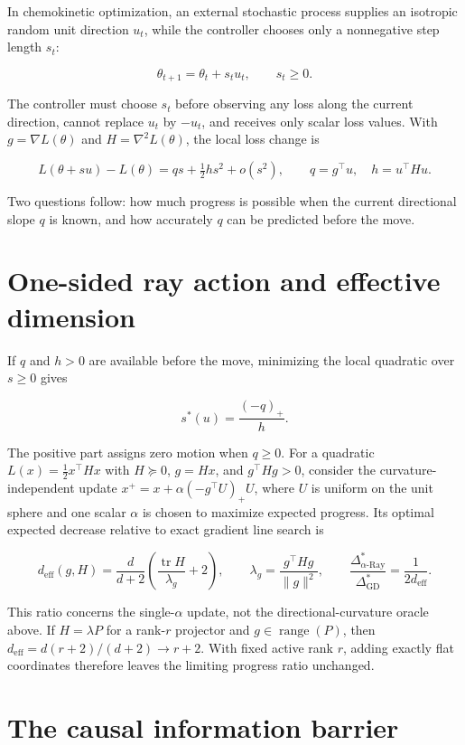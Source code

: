 \documentclass[11pt]{article}
\begin{document}
In chemokinetic optimization, an external stochastic process supplies an isotropic random unit direction \(u_t\), while the controller chooses only a nonnegative step length \(s_t\):

\[
\theta_{t+1}=\theta_t+s_tu_t,\qquad s_t\geq0.
\]

The controller must choose \(s_t\) before observing any loss along the current direction, cannot replace \(u_t\) by \(-u_t\), and receives only scalar loss values. With \(g=\nabla L(\theta)\) and \(H=\nabla^2L(\theta)\), the local loss change is

\[
L(\theta+su)-L(\theta)=qs+\tfrac12hs^2+o(s^2),
\qquad q=g^\top u,\quad h=u^\top Hu.
\]

Two questions follow: how much progress is possible when the current directional slope \(q\) is known, and how accurately \(q\) can be predicted before the move.

\section{One-sided ray action and effective dimension}\label{oracle-ray-ck}

If \(q\) and \(h>0\) are available before the move, minimizing the local quadratic over \(s\geq0\) gives

\[
s^*(u)=\frac{(-q)_+}{h}.
\]

The positive part assigns zero motion when \(q\geq0\). For a quadratic \(L(x)=\tfrac12x^\top Hx\) with \(H\succeq0\), \(g=Hx\), and \(g^\top Hg>0\), consider the curvature-independent update \(x^+=x+\alpha(-g^\top U)_+U\), where \(U\) is uniform on the unit sphere and one scalar \(\alpha\) is chosen to maximize expected progress. Its optimal expected decrease relative to exact gradient line search is

\[
d_{\mathrm{eff}}(g,H)
=\frac{d}{d+2}\left(\frac{\operatorname{tr}H}{\lambda_g}+2\right),
\qquad
\lambda_g=\frac{g^\top Hg}{\lVert g\rVert^2},
\qquad
\frac{\Delta^*_{\alpha\text{-Ray}}}{\Delta^*_{\mathrm{GD}}}
=\frac{1}{2d_{\mathrm{eff}}}.
\]

This ratio concerns the single-\(\alpha\) update, not the directional-curvature oracle above. If \(H=\lambda P\) for a rank-\(r\) projector and \(g\in\operatorname{range}(P)\), then \(d_{\mathrm{eff}}=d(r+2)/(d+2)\to r+2\). With fixed active rank \(r\), adding exactly flat coordinates therefore leaves the limiting progress ratio unchanged.

\section{The causal information barrier}\label{causal-information-barrier}
\end{document}

